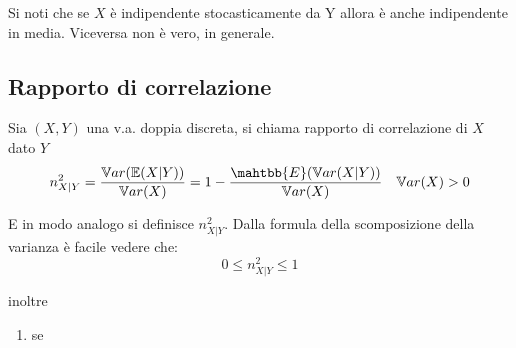 \documentclass[a4paper]{report}
\begin{document}
  Si noti che se $X$ è indipendente stocasticamente da Y allora è anche indipendente in media. Viceversa non è vero, in generale.

  \subsection{Rapporto di correlazione}
  Sia $(X,Y)$ una v.a. doppia discreta, si chiama rapporto di correlazione di $X$ dato $Y$
  \[ n^2_{X|Y} = \frac{\mathbb{V}ar(\mathbb{E}(X|Y))}{\mathbb{V}ar(X)} = 1- \frac{\mahtbb{E}(\mathbb{V}ar(X|Y))}{\mathbb{V}ar(X)} \quad \mathbb{V}ar(X) > 0\]

  E in modo analogo si definisce $n_{X|Y}^2$. Dalla formula della scomposizione della varianza è facile vedere che:
  \[ 0 \leq n_{X|Y}^2 \leq 1 \]

  inoltre
  \begin{enumerate}
    \item se 
  \end{enumerate}
\end{document}
